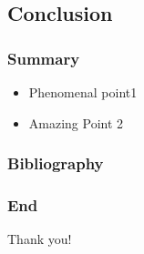 \documentclass[aspectratio=169]{beamer}
\begin{document}
\subsection{Conclusion}

\begin{frame}[t]\frametitle{Summary}
%
\begin{itemize}
\item Phenomenal point1
\item Amazing Point 2
\end{itemize}

\end{frame}

\begin{frame}[t]\frametitle{Bibliography}
\printbibliography
\end{frame}
\begin{frame}[t]\frametitle{End}
\begin{center}
\Huge
Thank you!
\end{center}
\end{frame}
\end{document}
